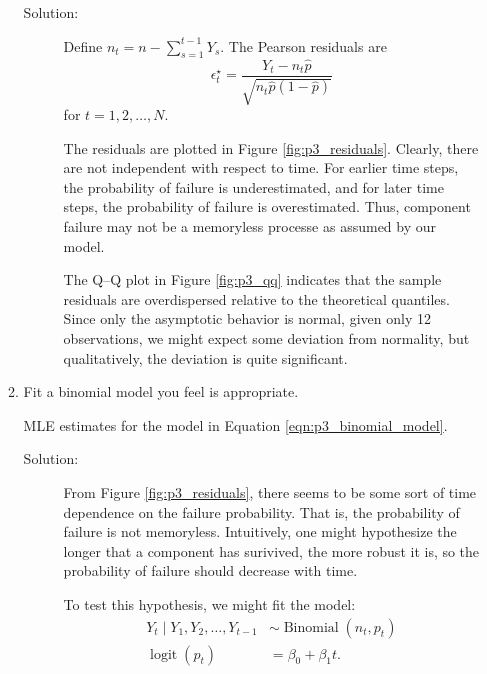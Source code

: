 \documentclass[letterpaper,11pt]{article}
\begin{document}
\begin{enumerate}
\begin{enumerate}
      \begin{description}        
      \item[Solution:] Define $n_t = n - \sum_{s=1}^{t-1} Y_s$. The Pearson
        residuals are
        \begin{equation}
          \epsilon_t^\star = \frac{Y_t - n_t\hat{p}}
          {\sqrt{n_t\hat{p}\left(1 - \hat{p}\right)}}
          \label{eqn:p3_pearson_residual}          
        \end{equation}
        for $t = 1,2,\ldots,N$.

        The residuals are plotted in Figure \ref{fig:p3_residuals}. Clearly,
        there are not independent with respect to time. For earlier time steps,
        the probability of failure is underestimated, and for later time steps,
        the probability of failure is overestimated. Thus, component failure may
        not be a memoryless processe as assumed by our model.

        The Q--Q plot in Figure \ref{fig:p3_qq} indicates that the sample
        residuals are overdispersed relative to the theoretical quantiles. Since
        only the asymptotic behavior is normal, given only 12 observations, we
        might expect some deviation from normality, but qualitatively, the
        deviation is quite significant.
      \end{description}
    \item Fit a binomial model you feel is appropriate.
      \begin{table}
        \centering
        
        \caption{MLE estimates for the model in Equation
          \ref{eqn:p3_binomial_model}.}
        \label{tab:p3_model_summary}
      \end{table}
      
      \begin{description}
      \item[Solution:] From Figure \ref{fig:p3_residuals}, there seems to be
        some sort of time dependence on the failure probability. That is, the
        probability of failure is not memoryless. Intuitively, one might
        hypothesize the longer that a component has surivived, the more robust
        it is, so the probability of failure should decrease with time.

        To test this hypothesis, we might fit the model:
        \begin{align}
          Y_t \mid Y_1,Y_2,\ldots, Y_{t-1}
          &\sim \operatorname{Binomial}\left(n_t, p_t\right)
          \label{eqn:p3_binomial_model} \\
          \operatorname{logit}\left(p_t\right)
          &= \beta_0 + \beta_1t. \nonumber
        \end{align}


\end{description}
\end{enumerate}
\end{enumerate}
\end{document}
